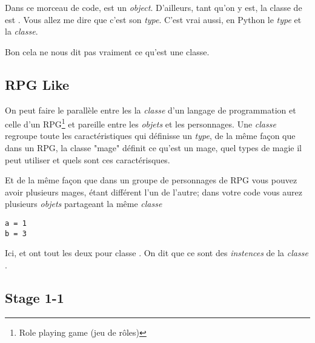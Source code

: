 Dans ce morceau de code,  est un \emph{object}.
D'ailleurs, tant qu'on y est, la classe de  est .
Vous allez me dire que  c'est son \emph{type}. C'est vrai aussi, en Python le \emph{type} et la \emph{classe}.

Bon cela ne nous dit pas vraiment ce qu'est une classe.

\subsection{RPG Like}

On peut faire le parallèle entre les la \emph{classe} d'un langage de programmation et celle d'un RPG\footnote{Role playing game (jeu de rôles)} et pareille entre les \emph{objets} et les personnages.
Une \emph{classe} regroupe toute les caractéristiques qui définisse un \emph{type}, de la même façon que dans un RPG, la classe "mage" définit ce qu'est un mage, quel types de magie il peut utiliser et quels sont ces caractérisques.

Et de la même façon que dans un groupe de personnages de RPG vous pouvez avoir plusieurs mages, étant différent l'un de l'autre; dans votre code vous aurez plusieurs \emph{objets} partageant la même \emph{classe}

\begin{lstlisting}
a = 1
b = 3
\end{lstlisting}

Ici,  et  ont tout les deux pour classe .
On dit que ce sont des \emph{instences} de la \emph{classe} .

\subsection{Stage 1-1}


